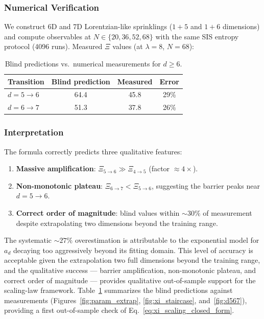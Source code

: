 \documentclass[12pt,a4paper]{article}
\begin{document}
\subsubsection{Numerical Verification}
\label{sec:numerical_verification}

We construct 6D and 7D Lorentzian-like sprinklings ($1 + 5$ and $1 + 6$ dimensions) and
compute observables at $N \in \{20, 36, 52, 68\}$ with the same SIS entropy protocol (4096 runs).
Measured $\Xi$ values (at $\lambda = 8$, $N = 68$):

\begin{table}[htbp]
\centering
\caption{Blind predictions vs.\ numerical measurements for $d \geq 6$.}
\label{tab:blind_vs_measured}
\begin{tabular}{@{}lccc@{}}
\toprule
Transition & Blind prediction & Measured & Error \\
\midrule
$d = 5 \to 6$ & 64.4 & 45.8 & 29\% \\
$d = 6 \to 7$ & 51.3 & 37.8 & 26\% \\
\bottomrule
\end{tabular}
\end{table}

\subsubsection{Interpretation}
\label{sec:d6_interpretation}

The formula correctly predicts three qualitative features:
\begin{enumerate}
  \item \textbf{Massive amplification}: $\Xi_{5 \to 6} \gg \Xi_{4 \to 5}$
    (factor $\approx 4\times$).
  \item \textbf{Non-monotonic plateau}: $\Xi_{6 \to 7} < \Xi_{5 \to 6}$,
    suggesting the barrier peaks near $d = 5 \to 6$.
  \item \textbf{Correct order of magnitude}: blind values within $\sim 30\%$
    of measurement despite extrapolating two dimensions beyond the training range.
\end{enumerate}

The systematic $\sim 27\%$ overestimation is attributable to the exponential model
for $a_d$ decaying too aggressively beyond its fitting domain.
This level of accuracy is acceptable given the extrapolation two full dimensions beyond
the training range, and the qualitative success --- barrier amplification, non-monotonic
plateau, and correct order of magnitude --- provides qualitative out-of-sample
support for the scaling-law framework.
Table~\ref{tab:blind_vs_measured} summarizes the blind predictions against measurements
(Figures~\ref{fig:param_extrap}, \ref{fig:xi_staircase}, and~\ref{fig:d567}),
providing a first out-of-sample check of Eq.~\eqref{eq:xi_scaling_closed_form}.
\end{document}
